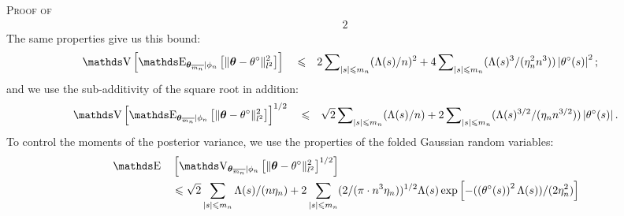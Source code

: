 \begin{pro}{\textsc{Proof of }\\}
\begin{alignat*}{2}
\end{alignat*}
The same properties give us this bound:
\begin{alignat*}{3}
&\V\left[\E_{\boldsymbol{\theta}_{\overline{m_{n}}} \vert \phi_{n}}\left[\Vert \boldsymbol{\theta} - \theta^{\circ} \Vert_{l^{2}}^{2}\right]\right] &&\leq&& 2 \sum\nolimits_{\vert s \vert \leq m_{n}} (\Lambda(s)/n)^{2} + 4 \sum\nolimits_{\vert s \vert \leq m_{n}}(\Lambda(s)^{3}/(\eta_{n}^{2} n^{3})) \left\vert\theta^{\circ}(s)\right\vert^{2};
\end{alignat*}
and we use the sub-additivity of the square root in addition:
\begin{alignat*}{3}
&\V\left[\E_{\boldsymbol{\theta}_{\overline{m_{n}}} \vert \phi_{n}}\left[\Vert \boldsymbol{\theta} - \theta^{\circ} \Vert_{l^{2}}^{2}\right]\right]^{1/2} &&\leq&& \sqrt{2}\sum\nolimits_{\vert s \vert \leq m_{n}} (\Lambda(s)/n) + 2 \sum\nolimits_{\vert s \vert \leq m_{n}}(\Lambda(s)^{3/2}/(\eta_{n} n^{3/2})) \left\vert\theta^{\circ}(s)\right\vert.\\
\end{alignat*}
To control the moments of the posterior variance, we use the properties of the folded Gaussian random variables:
\begin{alignat*}{2}
&\E&&\left[\V_{\boldsymbol{\theta}_{\overline{m_{n}}} \vert \phi_{n}}\left[\Vert \boldsymbol{\theta} - \theta^{\circ} \Vert_{l^{2}}^{2}\right]^{1/2}\right]\\
& && \leq \sqrt{2} \sum\limits_{\vert s \vert \leq m_{n}} \Lambda(s)/(n \eta_{n}) + 2 \sum\limits_{\vert s \vert \leq m_{n}} (2/(\pi \cdot n^{3} \eta_{n}))^{1/2}\Lambda(s) \exp\left[-(\left(\theta^{\circ}(s)\right)^{2} \Lambda(s))/(2 \eta_{n}^{2})\right]\\

\end{alignat*}
\end{pro}
